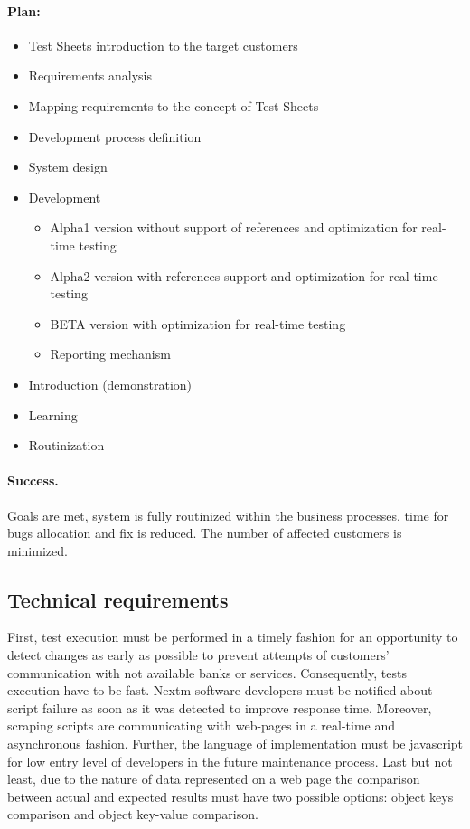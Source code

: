 \paragraph{Plan:}
\begin{itemize}
	\item Test Sheets introduction to the target customers
	\item Requirements analysis 
	\item Mapping requirements to the concept of Test Sheets
	\item Development process definition
	\item System design
	\item Development
	\begin{itemize}
		\item Alpha1 version without support of references and optimization for real-time testing
		\item Alpha2 version with references support and optimization for real-time testing
		\item BETA version with optimization for real-time testing
		\item Reporting mechanism
	\end{itemize}
	\item Introduction (demonstration)
	\item Learning
	\item Routinization
\end{itemize}

\paragraph{Success.} Goals are met, system is fully routinized within the business processes, time for bugs allocation and fix is reduced. The number of affected customers is minimized.


\subsection{Technical requirements}
First, test execution must be performed in a timely fashion for an opportunity to detect changes as early as possible to prevent attempts of customers' communication with not available banks or services. Consequently, tests execution have to be fast. 
Nextm software developers must be notified about script failure as soon as it was detected to improve response time. 
Moreover, scraping scripts are communicating with web-pages in a real-time and asynchronous fashion. 
Further, the language of implementation must be javascript for low entry level of developers in the future maintenance process. 
Last but not least, due to the nature of data represented on a web page the comparison between actual and expected results must have two possible options: object keys comparison and object key-value comparison.


